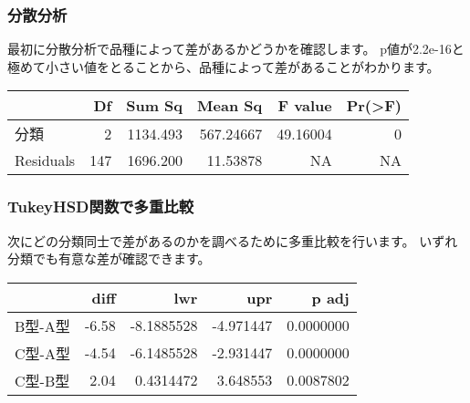 \documentclass[]{article}
\newenvironment{Shaded}{\begin{snugshade}}{\end{snugshade}}
\newcommand{\CommentTok}[1]{\textcolor[rgb]{0.56,0.35,0.01}{\textit{#1}}}
\newcommand{\DataTypeTok}[1]{\textcolor[rgb]{0.13,0.29,0.53}{#1}}
\newcommand{\KeywordTok}[1]{\textcolor[rgb]{0.13,0.29,0.53}{\textbf{#1}}}
\newcommand{\NormalTok}[1]{#1}
\newcommand{\OperatorTok}[1]{\textcolor[rgb]{0.81,0.36,0.00}{\textbf{#1}}}
\newcommand{\StringTok}[1]{\textcolor[rgb]{0.31,0.60,0.02}{#1}}
\begin{document}
\subsubsection{分散分析}

最初に分散分析で品種によって差があるかどうかを確認します。
p値が2.2e-16と極めて小さい値をとることから、品種によって差があることがわかります。

\begin{Shaded}
\end{Shaded}

\begin{longtable}[]{@{}lrrrrr@{}}
\toprule
& Df & Sum Sq & Mean Sq & F value & Pr(\textgreater{}F)\tabularnewline
\midrule
\endhead
分類 & 2 & 1134.493 & 567.24667 & 49.16004 & 0\tabularnewline
Residuals & 147 & 1696.200 & 11.53878 & NA & NA\tabularnewline
\bottomrule
\end{longtable}

\hypertarget{tukeyhsd}{%
\subsubsection{TukeyHSD関数で多重比較}\label{tukeyhsd}}

次にどの分類同士で差があるのかを調べるために多重比較を行います。
いずれ分類でも有意な差が確認できます。

\begin{Shaded}
\end{Shaded}

\begin{longtable}[]{@{}lrrrr@{}}
\toprule
& diff & lwr & upr & p adj\tabularnewline
\midrule
\endhead
B型-A型 & -6.58 & -8.1885528 & -4.971447 & 0.0000000\tabularnewline
C型-A型 & -4.54 & -6.1485528 & -2.931447 & 0.0000000\tabularnewline
C型-B型 & 2.04 & 0.4314472 & 3.648553 & 0.0087802\tabularnewline
\bottomrule
\end{longtable}
\end{document}

